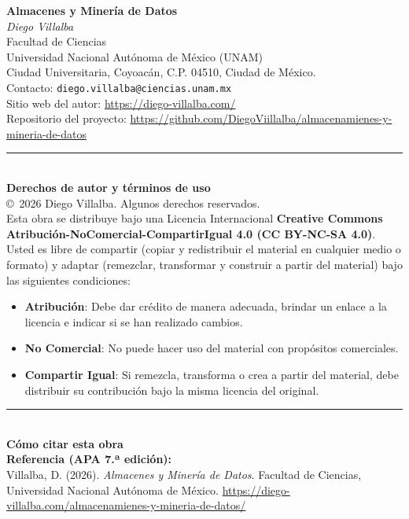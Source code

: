 \noindent
\textbf{Almacenes y Minería de Datos}\\
\textit{Diego Villalba}\\[1em]
\noindent
Facultad de Ciencias\\
Universidad Nacional Autónoma de México (UNAM)\\
Ciudad Universitaria, Coyoacán, C.P. 04510, Ciudad de México.\\
Contacto: \texttt{diego.villalba@ciencias.unam.mx}\\
Sitio web del autor: \url{https://diego-villalba.com/}\\
Repositorio del proyecto: \url{https://github.com/DiegoViillalba/almacenamienes-y-mineria-de-datos}\\[1.5em]
\rule{\linewidth}{0.5pt}\\[1em]
\textbf{Derechos de autor y términos de uso}\\[0.5em]
\copyright\ 2026 Diego Villalba. Algunos derechos reservados.\\[0.5em]
Esta obra se distribuye bajo una Licencia Internacional \textbf{Creative Commons Atribución-NoComercial-CompartirIgual 4.0 (CC BY-NC-SA 4.0)}.\\[0.5em]
\small
Usted es libre de compartir (copiar y redistribuir el material en cualquier medio o formato) y adaptar (remezclar, transformar y construir a partir del material) bajo las siguientes condiciones:
\begin{itemize}\tightlist
  \item \textbf{Atribución}: Debe dar crédito de manera adecuada, brindar un enlace a la licencia e indicar si se han realizado cambios.
  \item \textbf{No Comercial}: No puede hacer uso del material con propósitos comerciales.
  \item \textbf{Compartir Igual}: Si remezcla, transforma o crea a partir del material, debe distribuir su contribución bajo la misma licencia del original.
\end{itemize}
\normalsize
\vspace{1em}
\rule{\linewidth}{0.5pt}\\[1em]
\textbf{Cómo citar esta obra}\\[0.5em]
\textbf{Referencia (APA 7.ª edición):}\\
{\small Villalba, D. (2026). \textit{Almacenes y Minería de Datos}. Facultad de Ciencias, Universidad Nacional Autónoma de México. \url{https://diego-villalba.com/almacenamienes-y-mineria-de-datos/}}\\[1em]
